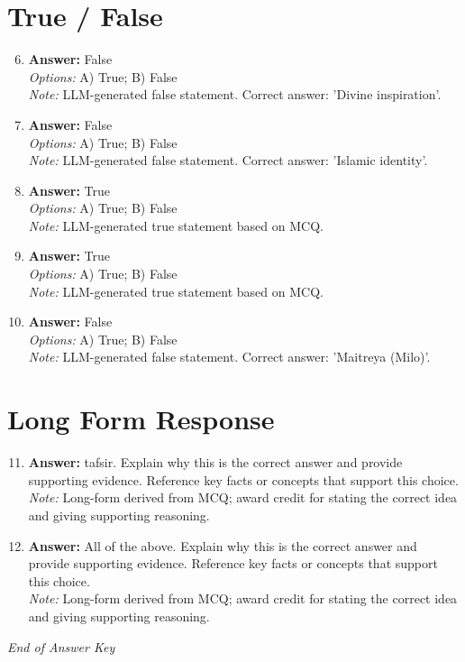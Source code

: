 \documentclass[12pt]{article}
\begin{document}
\section*{True / False}
\begin{enumerate}[label=\arabic*.]
\setcounter{enumi}{5}
\item \textbf{Answer:} False
\\ \textit{Options:} A) True; B) False
\\ \textit{Note:} LLM-generated false statement. Correct answer: 'Divine inspiration'.
\item \textbf{Answer:} False
\\ \textit{Options:} A) True; B) False
\\ \textit{Note:} LLM-generated false statement. Correct answer: 'Islamic identity'.
\item \textbf{Answer:} True
\\ \textit{Options:} A) True; B) False
\\ \textit{Note:} LLM-generated true statement based on MCQ.
\item \textbf{Answer:} True
\\ \textit{Options:} A) True; B) False
\\ \textit{Note:} LLM-generated true statement based on MCQ.
\item \textbf{Answer:} False
\\ \textit{Options:} A) True; B) False
\\ \textit{Note:} LLM-generated false statement. Correct answer: 'Maitreya (Milo)'.
\end{enumerate}

\section*{Long Form Response}
\begin{enumerate}[label=\arabic*.]
\setcounter{enumi}{10}
\item \textbf{Answer:} tafsir. Explain why this is the correct answer and provide supporting evidence. Reference key facts or concepts that support this choice.
\\ \textit{Note:} Long-form derived from MCQ; award credit for stating the correct idea and giving supporting reasoning.
\item \textbf{Answer:} All of the above. Explain why this is the correct answer and provide supporting evidence. Reference key facts or concepts that support this choice.
\\ \textit{Note:} Long-form derived from MCQ; award credit for stating the correct idea and giving supporting reasoning.
\end{enumerate}

\vfill
\noindent\textit{End of Answer Key}
\end{document}

